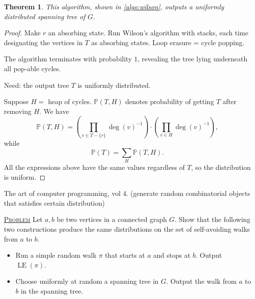 \documentclass{report}
\newcommand{\matP}{\mathbb{P}}
\def \LE {\operatorname{LE}}
\newcommand{\fancyem}[1]{\underline{\textsc{#1}}}
\newtheorem{theorem}{Theorem}[section]
\theoremstyle{definition}
\theoremstyle{remark}
\numberwithin{equation}{section}
\begin{document}
\begin{theorem}
    This algorithm, shown in \autoref{algo:wilson}, outputs a uniformly distributed spanning tree of $G$.
\end{theorem}
\begin{proof}
    Make $r$ an absorbing state. Run Wilson's algorithm with stacks, each time designating the vertices in $T$ as absorbing states. Loop erasure = cycle popping.

    The algorithm terminates with probability $1$, revealing the tree lying underneath all pop-able cycles. 

    Need: the output tree $T$ is uniformly distributed.

    Suppose $H = $ heap of cycles. $\matP(T, H)$ denotes probability of getting $T$ after removing $H$. We have 
    \[
        \matP(T, H) = \left(\prod_{v \in T - \{r\}} \deg(v)^{-1}\right)\cdot\left(\prod_{v \in H}\deg(v)^{-1}\right),
    \]
    while \[
        \matP(T) = \sum_{H} \matP(T, H).
    \]
    All the expressions above have the same values regardless of $T$, so the distribution is uniform.
\end{proof}

The art of computer programming, vol 4. (generate random combinatorial objects that satisfies certain distribution)

\fancyem{Problem} Let $a, b$ be two vertices in a connected graph $G$. Show that the following two constructions produce the same distributions on the set of self-avoiding walks from $a$ to $b$.
\begin{itemize}
    \item Run a simple random walk $\pi$ that starts at $a$ and stops at $b$. Output $\LE(\pi)$.
    \item Choose uniformly at random a spanning tree in $G$. Output the walk from $a$ to $b$ in the spanning tree.
\end{itemize}
\end{document}
